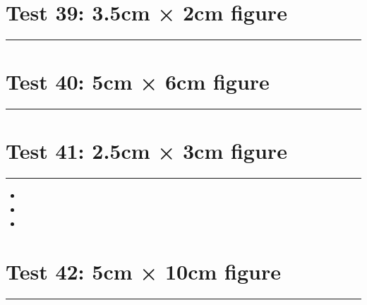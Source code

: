 \documentclass[a4paper,11pt]{article}
\begin{document}
\section*{Test 39: 3.5cm × 2cm figure}
\begin{swarmwrap}%
  \begin{minipage}[t]{3cm}
    \centering
    \rule{\linewidth}{2cm}
  \end{minipage}%
\end{swarmwrap}%
\swarmwrapnext
\lipsum[94]
\lipsum[95]
\lipsum[96]
\section*{Test 40: 5cm × 6cm figure}
\begin{swarmwrap}%
  \begin{minipage}[t]{5cm}
    \centering
    \rule{\linewidth}{6cm}
  \end{minipage}%
\end{swarmwrap}%
\swarmwrapnext
\lipsum[16]
\lipsum[17]
\lipsum[18]
\lipsum[19]
\section*{Test 41: 2.5cm × 3cm figure}
\begin{swarmwrap}%
  \begin{minipage}[t]{2cm}
    \centering
    \rule{\linewidth}{3cm}
  \end{minipage}%
\end{swarmwrap}%
\swarmwrapnext
\lipsum[125]
\begin{itemize}
  \item \lipsum[126][1-3]
  \item \lipsum[127][1-3]
  \item \lipsum[128][1-3]
\end{itemize}
\section*{Test 42: 5cm × 10cm figure}
\begin{swarmwrap}%
  \begin{minipage}[t]{5cm}
    \centering
    \rule{\linewidth}{10cm}
  \end{minipage}%
\end{swarmwrap}%
\swarmwrapnext
\lipsum[34]
\lipsum[35]
\lipsum[36]
\lipsum[37]
\end{document}
